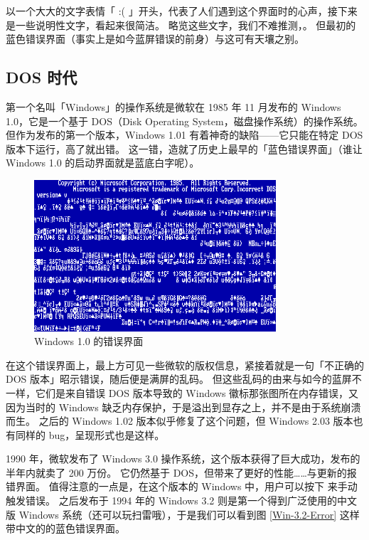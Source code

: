 以一个大大的文字表情「 :( 」开头，代表了人们遇到这个界面时的心声，接下来是一些说明性文字，看起来很简洁。
略览这些文字，我们不难推测，。
但最初的蓝色错误界面（事实上是如今蓝屏错误的前身）与这可有天壤之别。

\subsection{DOS 时代}

第一个名叫「Windows」的操作系统是微软在 1985 年 11 月发布的 Windows 1.0，它是一个基于 DOS（Disk Operating System，磁盘操作系统）的操作系统。
但作为发布的第一个版本，Windows 1.01 有着神奇的缺陷——它只能在特定 DOS 版本下运行，高了就出错。
这一错，造就了历史上最早的「蓝色错误界面」（谁让 Windows 1.0 的启动界面就是蓝底白字呢）。

\begin{figure}[htb!]
  \centering
  \includegraphics[width=9cm]{assets/Win-1.0-Error.png}
  \caption{Windows 1.0 的错误界面}
  \label{Win-1.0-Error}
\end{figure}

在这个错误界面上，最上方可见一些微软的版权信息，紧接着就是一句「不正确的 DOS 版本」昭示错误，随后便是满屏的乱码。
但这些乱码的由来与如今的蓝屏不一样，它们是来自错误 DOS 版本导致的 Windows 徽标那张图所在内存错误，又因为当时的 Windows 缺乏内存保护，于是溢出到显存之上，并不是由于系统崩溃而生。
之后的 Windows 1.02 版本似乎修复了这个问题，但 Windows 2.03 版本也有同样的 bug，呈现形式也是这样。

1990 年，微软发布了 Windows 3.0 操作系统，这个版本获得了巨大成功，发布的半年内就卖了 200 万份。
它仍然基于 DOS，但带来了更好的性能……与更新的报错界面。
值得注意的一点是，在这个版本的 Windows 中，用户可以按下  来手动触发错误。
之后发布于 1994 年的 Windows 3.2 则是第一个得到广泛使用的中文版 Windows 系统（还可以玩扫雷哦），于是我们可以看到图 \ref{Win-3.2-Error} 这样带中文的的蓝色错误界面。

